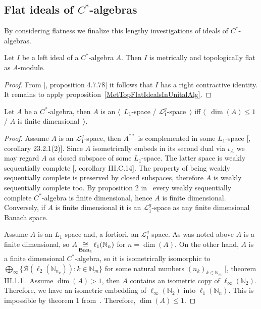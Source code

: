 
\subsection{
    Flat ideals of \texorpdfstring{$C^*$}{C*}-algebras}\label{
SubSectionFlatIdealsOfCStarAlgebras}

By considering flatness we finalize this lengthy investigations of ideals of
$C^*$-algebras.

\begin{proposition}\label{IdealofCstarAlgisMetTopFlat} Let $I$ be a left ideal
of a $C^*$-algebra $A$. Then $I$ is metrically and topologically flat as
$A$-module.
\end{proposition}
\begin{proof} From [\cite{HelBanLocConvAlg}, proposition 4.7.78] it follows that
$I$ has a right contractive identity. It remains to apply
proposition~\ref{MetTopFlatIdealsInUnitalAlg}.
\end{proof}

\begin{proposition}\label{CStarAlgIsL1IfFinDim} Let $A$ be a $C^*$-algebra, then
$A$ is an $\langle$~$L_1$-space / $\mathscr{L}_1^g$-space~$\rangle$ iff
$\langle$~$\operatorname{dim}(A)\leq 1$ / $A$ is finite dimensional~$\rangle$.
\end{proposition}
\begin{proof} Assume $A$ is an $\mathscr{L}_1^g$-space, then $A^{**}$ is
complemented in some $L_1$-space [\cite{DefFloTensNorOpId}, corollary
23.2.1(2)]. Since $A$ isometrically embeds in its second dual via $\iota_{A}$ we
may regard $A$ as closed subspace of some $L_1$-space. The latter space is
weakly sequentially complete [\cite{WojBanSpForAnalysts}, corollary III.C.14].
The property of being weakly sequentially complete is preserved by closed
subspaces, therefore $A$ is weakly sequentially complete too. By proposition 2
in~\cite{SakWeakCompOpOnOpAlg} every weakly sequentially complete $C^*$-algebra
is finite dimensional, hence $A$ is finite dimensional. Conversely, if $A$ is
finite dimensional it is an $\mathscr{L}_1^g$-space as any finite dimensional
Banach space.

Assume $A$ is an $L_1$-space and, a fortiori, an $\mathscr{L}_1^g$-space. As was
noted above $A$ is a finite dimensional, so
$A\mathop{\mathbin{\cong}}\limits_{\mathbf{Ban}_1}\ell_1(\mathbb{N}_n)$ for $n=\operatorname{dim}(A)$. On
the other hand, $A$ is a finite dimensional $C^*$-algebra, so it is
isometrically isomorphic to $\bigoplus_\infty \{
\mathcal{B}(\ell_2(\mathbb{N}_{n_k})):k\in\mathbb{N}_m \}$ for some natural
numbers ${(n_k)}_{k\in\mathbb{N}_m}$ 
[\cite{DavCSatrAlgByExmpl}, theorem III.1.1].
Assume $\operatorname{dim}(A)>1$, then $A$ contains an isometric copy of
$\ell_\infty(\mathbb{N}_2)$. Therefore, we have an isometric embedding of
$\ell_\infty(\mathbb{N}_2)$ into $\ell_1(\mathbb{N}_n)$. This is impossible by
theorem 1 from~\cite{LyubIsomEmdbFinDimLp}. 
Therefore, $\operatorname{dim}(A)\leq 1$. 
\end{proof}

